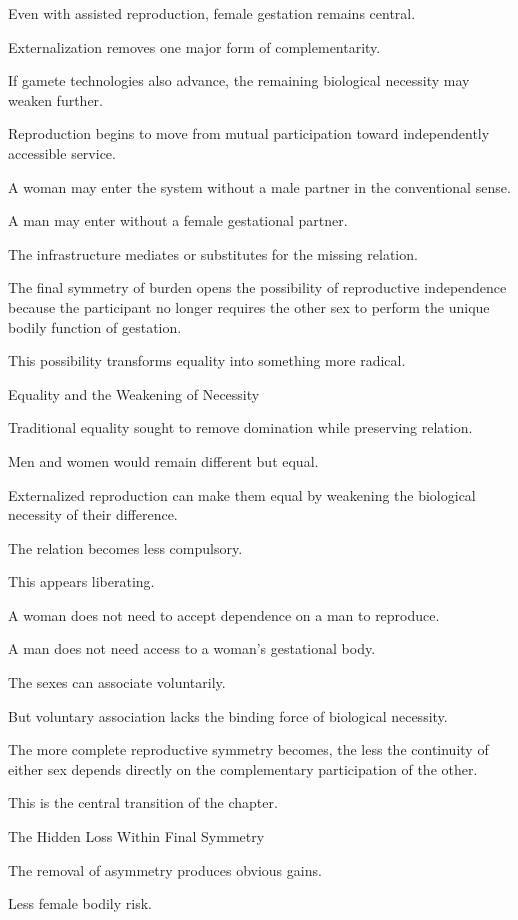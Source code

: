 Even with assisted reproduction, female gestation remains central.

Externalization removes one major form of complementarity.

If gamete technologies also advance, the remaining biological necessity may weaken further.

Reproduction begins to move from mutual participation toward independently accessible service.

A woman may enter the system without a male partner in the conventional sense.

A man may enter without a female gestational partner.

The infrastructure mediates or substitutes for the missing relation.

The final symmetry of burden opens the possibility of reproductive independence because the participant no longer requires the other sex to perform the unique bodily function of gestation.

This possibility transforms equality into something more radical.

Equality and the Weakening of Necessity

Traditional equality sought to remove domination while preserving relation.

Men and women would remain different but equal.

Externalized reproduction can make them equal by weakening the biological necessity of their difference.

The relation becomes less compulsory.

This appears liberating.

A woman does not need to accept dependence on a man to reproduce.

A man does not need access to a woman’s gestational body.

The sexes can associate voluntarily.

But voluntary association lacks the binding force of biological necessity.

The more complete reproductive symmetry becomes, the less the continuity of either sex depends directly on the complementary participation of the other.

This is the central transition of the chapter.

The Hidden Loss Within Final Symmetry

The removal of asymmetry produces obvious gains.

Less female bodily risk.

